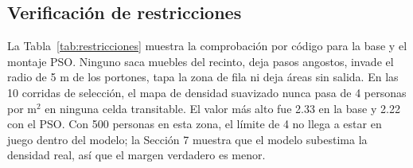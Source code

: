 \documentclass[11pt,letterpaper]{article}
\begin{document}
\subsection{Verificación de restricciones}
La Tabla~\ref{tab:restricciones} muestra la comprobación por código para la base y el montaje PSO. Ninguno saca muebles del recinto, deja pasos angostos, invade el radio de 5 m de los portones, tapa la zona de fila ni deja áreas sin salida. En las 10 corridas de selección, el mapa de densidad suavizado nunca pasa de 4 personas por m$^2$ en ninguna celda transitable. El valor más alto fue 2.33 en la base y 2.22 con el PSO. Con 500 personas en esta zona, el límite de 4 no llega a estar en juego dentro del modelo; la Sección 7 muestra que el modelo subestima la densidad real, así que el margen verdadero es menor.

\begin{table}[H]
\centering
\caption{Comprobación de restricciones por código (10 corridas por montaje).}
\label{tab:restricciones}

\end{table}
\end{document}
